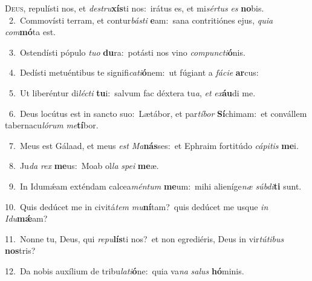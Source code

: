 \lettrine{\initial\textcolor{\initialcolor}{D}}{eus,} repulísti nos, et \textit{de}\-\textit{stru}\textbf{xís}ti nos:~\star irátus es, et mi\-\textit{sér}\-\textit{tus} \textit{es} \textbf{no}\-bis.\\
{\numbfont\textcolor{\numbcolor}{~2.}}~Commovísti terram, et contur\-\textit{bás}\-\textit{ti} \textbf{e}\-am:~\star sana contritiónes ejus, \textit{qui}\-\textit{a} \textit{com}\-\textbf{mó}ta est.\par
{\numbfont\textcolor{\numbcolor}{~3.}}~Ostendísti pópulo \textit{tu}\-\textit{o} \textbf{du}\-ra:~\star potásti nos vino \textit{com}\-\textit{punc}\textit{ti}\textbf{ó}nis.\par
{\numbfont\textcolor{\numbcolor}{~4.}}~Dedísti metuéntibus te signifi\-\textit{ca}\-\textit{ti}\textbf{ó}nem:~\star ut fúgiant a \textit{fá}\-\textit{ci}\textit{e} \textbf{ar}\-cus:\par
{\numbfont\textcolor{\numbcolor}{~5.}}~Ut liberéntur di\-\textit{léc}\-\textit{ti} \textbf{tu}\-i:~\star salvum fac déxtera tu\-\textit{a}\-, \textit{et} \textit{ex}\-\textbf{áu}di me.\par
{\numbfont\textcolor{\numbcolor}{~6.}}~Deus locútus est in sancto suo:~\dagger Lætábor, et par\-\textit{tí}\-\textit{bor} \textbf{Sí}\-chimam:~\star et convállem tabernacu\-\textit{ló}\-\textit{rum} \textit{me}\-\textbf{tí}bor.\par
{\numbfont\textcolor{\numbcolor}{~7.}}~Meus est Gálaad, et meus \textit{est} \textit{Ma}\-\textbf{nás}ses:~\star et Ephraim fortitúdo \textit{cá}\-\textit{pi}\textit{tis} \textbf{me}\-i.\par
{\numbfont\textcolor{\numbcolor}{~8.}}~Ju\textit{da} \textit{rex} \textbf{me}\-us:~\star Moab ol\textit{la} \textit{spe}\-\textit{i} \textbf{me}\-æ.\par
{\numbfont\textcolor{\numbcolor}{~9.}}~In Idumǽam exténdam calcea\-\textit{mén}\-\textit{tum} \textbf{me}\-um:~\star mihi alieníge\textit{næ} \textit{súb}\-\textit{di}\textbf{ti} sunt.\par
{\numbfont\textcolor{\numbcolor}{10.}}~Quis dedúcet me in civitá\textit{tem} \textit{mu}\-\textbf{ní}tam?~\star quis dedúcet me usque \textit{in} \textit{I}\-\textit{du}\textbf{mǽ}am?\par
{\numbfont\textcolor{\numbcolor}{11.}}~Nonne tu, Deus, qui \textit{re}\-\textit{pu}\textbf{lís}ti nos?~\star et non egrediéris, Deus in vir\-\textit{tú}\-\textit{ti}\textit{bus} \textbf{nos}\-tris?\par
{\numbfont\textcolor{\numbcolor}{12.}}~Da nobis auxílium de tribu\-\textit{la}\-\textit{ti}\textbf{ó}ne:~\star quia va\textit{na} \textit{sa}\-\textit{lus} \textbf{hó}\-minis.\par
